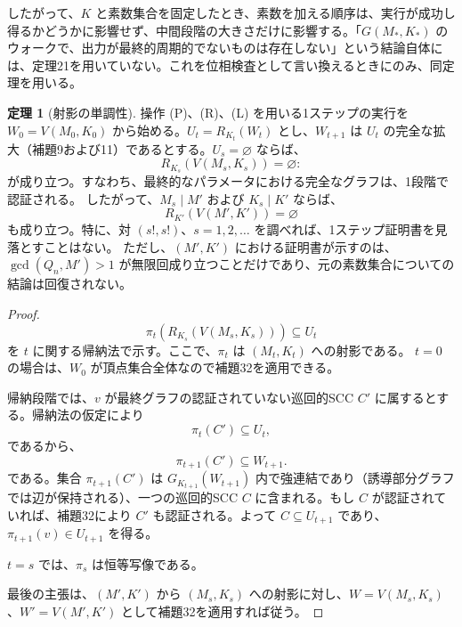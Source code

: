 \documentclass[11pt,reqno]{amsart}
\theoremstyle{definition}
\newtheorem{theorem}{定理}
\theoremstyle{definition}
\theoremstyle{remark}
\begin{document}
したがって、\(K\) と素数集合を固定したとき、素数を加える順序は、実行が成功し得るかどうかに影響せず、中間段階の大きさだけに影響する。「\(G(M_*,K_*)\) のウォークで、出力が最終的周期的でないものは存在しない」という結論自体には、定理21を用いていない。これを位相検査として言い換えるときにのみ、同定理を用いる。

\begin{samepage}
\begin{theorem}[射影の単調性]\leavevmode\label{thm:34}
操作 (P)、(R)、(L) を用いる1ステップの実行を \(W_0=V(M_0,K_0)\) から始める。\(U_t=R_{K_t}(W_t)\) とし、\(W_{t+1}\) は \(U_t\) の完全な拡大（補題9および11）であるとする。\(U_s=\varnothing\) ならば、
\[
R_{K_s}(V(M_s,K_s))=\varnothing:
\]
が成り立つ。すなわち、最終的なパラメータにおける完全なグラフは、1段階で認証される。
したがって、\(M_s\mid M'\) および \(K_s\mid K'\) ならば、
\[
R_{K'}(V(M',K'))=\varnothing
\]
も成り立つ。特に、対 \((s!,s!)\)、\(s=1,2,\ldots\) を調べれば、1ステップ証明書を見落とすことはない。
ただし、\((M',K')\) における証明書が示すのは、\(\gcd(Q_n,M')>1\) が無限回成り立つことだけであり、元の素数集合についての結論は回復されない。
\label{thm-end:34}
\end{theorem}
\end{samepage}

\begin{proof}\leavevmode\label{proof:34}
\[
\pi_t(R_{K_s}(V(M_s,K_s)))\subseteq U_t
\]
を \(t\) に関する帰納法で示す。ここで、\(\pi_t\) は \((M_t,K_t)\) への射影である。
\(t=0\) の場合は、\(W_0\) が頂点集合全体なので補題32を適用できる。

帰納段階では、\(v\) が最終グラフの認証されていない巡回的SCC \(C'\) に属するとする。帰納法の仮定により
\[
\pi_t(C')\subseteq U_t,
\]
であるから、
\[
\pi_{t+1}(C')\subseteq W_{t+1}.
\]
である。集合 \(\pi_{t+1}(C')\) は \(G_{K_{t+1}}(W_{t+1})\) 内で強連結であり（誘導部分グラフでは辺が保持される）、一つの巡回的SCC \(C\) に含まれる。もし \(C\) が認証されていれば、補題32により \(C'\) も認証される。よって \(C\subseteq U_{t+1}\) であり、\(\pi_{t+1}(v)\in U_{t+1}\) を得る。

\(t=s\) では、\(\pi_s\) は恒等写像である。

最後の主張は、\((M',K')\) から \((M_s,K_s)\) への射影に対し、\(W=V(M_s,K_s)\)、\(W'=V(M',K')\) として補題32を適用すれば従う。\qedhere
\end{proof}
\end{document}
